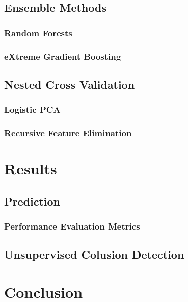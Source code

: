 \documentclass[a4paper,12pt, headsepline]{scrartcl}
\numberwithin{equation}{section}
\begin{document}
\subsection{Ensemble Methods}\label{subsec:ens}
\subsubsection{Random Forests}\label{subsubsec:rf}
\subsubsection{eXtreme Gradient Boosting}\label{subsubsec:xgb}
\subsection{Nested Cross Validation}\label{subsec:nest}
\subsubsection{Logistic PCA}\label{subsubsec:logp}
\subsubsection{Recursive Feature Elimination}\label{subsubsec:rfe}
\section{Results}\label{sec:res}
\subsection{Prediction}\label{subsec:pred}
\subsubsection{Performance Evaluation Metrics}\label{subsubsec:per}
\subsection{Unsupervised Colusion Detection}\label{subsec:col}
\section{Conclusion}\label{sec:con}
 
\newpage
\printbibliography
\end{document}
